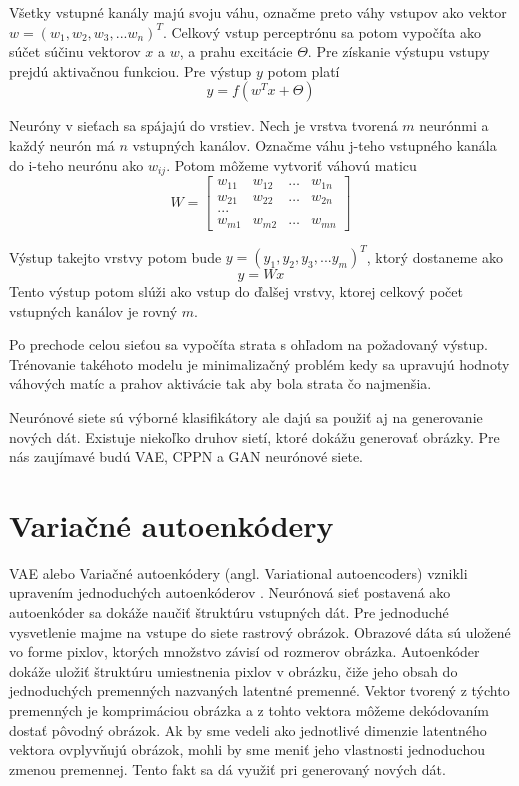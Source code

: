 Všetky vstupné kanály majú svoju váhu, označme preto váhy vstupov ako vektor \(w = (w_1, w_2, w_3, ... w_n)^T\).
Celkový vstup perceptrónu sa potom vypočíta ako súčet súčinu vektorov \(x\) a \(w\), a prahu excitácie \(\Theta\).
Pre získanie výstupu vstupy prejdú aktivačnou funkciou.
Pre výstup \(y\) potom platí \[y = f(w^Tx + \Theta)\]

Neuróny v sieťach sa spájajú do vrstiev. Nech je vrstva tvorená \(m\) neurónmi a každý neurón má \(n\) vstupných kanálov.
Označme váhu j-teho vstupného kanála do i-teho neurónu ako \(w_{ij}\).
Potom môžeme vytvoriť váhovú maticu
\[
W = \begin{bmatrix}
		w_{11} & w_{12} & \dots & w_{1n} \\
		w_{21} & w_{22} & \dots & w_{2n} \\
		{...}							\\
		w_{m1} & w_{m2} & \dots & w_{mn}
     \end{bmatrix}
\]

Výstup takejto vrstvy potom bude \(y = (y_1, y_2, y_3, ... y_m)^T\), ktorý dostaneme ako \[y = Wx\]
Tento výstup potom slúži ako vstup do ďalšej vrstvy, ktorej celkový počet vstupných kanálov je rovný \(m\).

Po prechode celou sieťou sa vypočíta strata s ohľadom na požadovaný výstup.
Trénovanie takéhoto modelu je minimalizačný problém kedy sa upravujú hodnoty váhových matíc a prahov aktivácie tak aby bola strata čo najmenšia.

Neurónové siete sú výborné klasifikátory ale dajú sa použiť aj na generovanie nových dát.
Existuje niekoľko druhov sietí, ktoré dokážu generovať obrázky.
Pre nás zaujímavé budú VAE, CPPN a GAN neurónové siete. 

\section{Variačné autoenkódery}
VAE alebo Variačné autoenkódery (angl. Variational autoencoders) vznikli upravením jednoduchých autoenkóderov \cite{VAE}.
Neurónová sieť postavená ako autoenkóder sa dokáže naučiť štruktúru vstupných dát.
Pre jednoduché vysvetlenie majme na vstupe do siete rastrový obrázok.
Obrazové dáta sú uložené vo forme pixlov, ktorých množstvo závisí od rozmerov obrázka.
Autoenkóder dokáže uložiť štruktúru umiestnenia pixlov v obrázku, čiže jeho obsah do jednoduchých premenných nazvaných latentné premenné.
Vektor tvorený z týchto premenných je komprimáciou obrázka a z tohto vektora môžeme dekódovaním dostať pôvodný obrázok.
Ak by sme vedeli ako jednotlivé dimenzie latentného vektora ovplyvňujú obrázok, mohli by sme meniť jeho vlastnosti jednoduchou zmenou premennej.
Tento fakt sa dá využiť pri generovaný nových dát.

